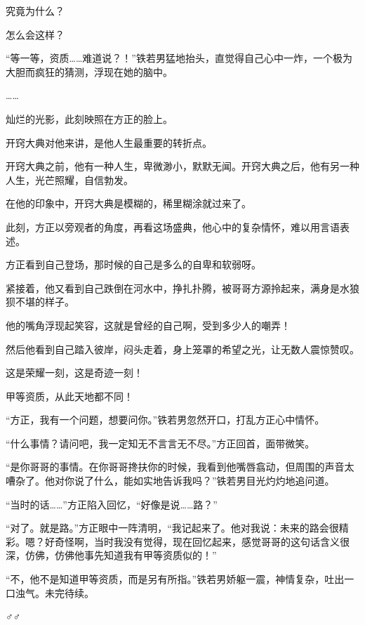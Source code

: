 \begin{this_body}
究竟为什么？

怎么会这样？

“等一等，资质……难道说？！”铁若男猛地抬头，直觉得自己心中一炸，一个极为大胆而疯狂的猜测，浮现在她的脑中。

……

灿烂的光影，此刻映照在方正的脸上。

开窍大典对他来讲，是他人生最重要的转折点。

开窍大典之前，他有一种人生，卑微渺小，默默无闻。开窍大典之后，他有另一种人生，光芒照耀，自信勃发。

在他的印象中，开窍大典是模糊的，稀里糊涂就过来了。

此刻，方正以旁观者的角度，再看这场盛典，他心中的复杂情怀，难以用言语表述。

方正看到自己登场，那时候的自己是多么的自卑和软弱呀。

紧接着，他又看到自己跌倒在河水中，挣扎扑腾，被哥哥方源拎起来，满身是水狼狈不堪的样子。

他的嘴角浮现起笑容，这就是曾经的自己啊，受到多少人的嘲弄！

然后他看到自己踏入彼岸，闷头走着，身上笼罩的希望之光，让无数人震惊赞叹。

这是荣耀一刻，这是奇迹一刻！

甲等资质，从此天地都不同！

“方正，我有一个问题，想要问你。”铁若男忽然开口，打乱方正心中情怀。

“什么事情？请问吧，我一定知无不言言无不尽。”方正回首，面带微笑。

“是你哥哥的事情。在你哥哥搀扶你的时候，我看到他嘴唇翕动，但周围的声音太嘈杂了。他对你说了什么，能如实地告诉我吗？”铁若男目光灼灼地追问道。

“当时的话……”方正陷入回忆，“好像是说……路？”

“对了。就是路。”方正眼中一阵清明，“我记起来了。他对我说：未来的路会很精彩。嗯？好奇怪啊，当时我没有觉得，现在回忆起来，感觉哥哥的这句话含义很深，仿佛，仿佛他事先知道我有甲等资质似的！”

“不，他不是知道甲等资质，而是另有所指。”铁若男娇躯一震，神情复杂，吐出一口浊气。未完待续。

♂♂

\end{this_body}

